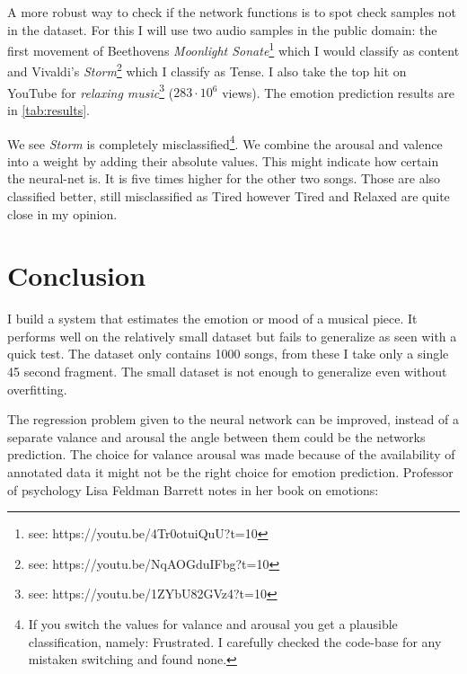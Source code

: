 \documentclass[lang=en, hanging-titles=true]{skrapport}
\begin{document}
A more robust way to check if the network functions is to spot check samples not in the dataset. For this I will use two audio samples in the public domain: the first movement of Beethovens \textit{Moonlight Sonate}\footnote{see: https://youtu.be/4Tr0otuiQuU?t=10} which I would classify as content and Vivaldi's \textit{Storm}\footnote{see: https://youtu.be/NqAOGduIFbg?t=10} which I classify as Tense. I also take the top hit on YouTube for \textit{relaxing music}\footnote{see: https://youtu.be/1ZYbU82GVz4?t=10} ($283\cdot10^6$ views). The emotion prediction results are in \cref{tab:results}.


We see \textit{Storm} is completely misclassified\footnote{If you switch the values for valance and arousal you get a plausible classification, namely: Frustrated. I carefully checked the code-base for any mistaken switching and found none.}. We combine the arousal and valence into a weight by adding their absolute values. This might indicate how certain the neural-net is. It is five times higher for the other two songs. Those are also classified better, still misclassified as Tired however Tired and Relaxed are quite close in my opinion.

\section{Conclusion}
I build a system that estimates the emotion or mood of a musical piece. It performs well on the relatively small dataset but fails to generalize as seen with a quick test. The dataset only contains 1000 songs, from these I take only a single 45 second fragment. The small dataset is not enough to generalize even without overfitting. 

The regression problem given to the neural network can be improved, instead of a separate valance and arousal the angle between them could be the networks prediction. The choice for valance arousal was made because of the availability of annotated data it might not be the right choice for emotion prediction. Professor of psychology Lisa Feldman Barrett\cite{feldman} notes in her book on emotions:
\end{document}
